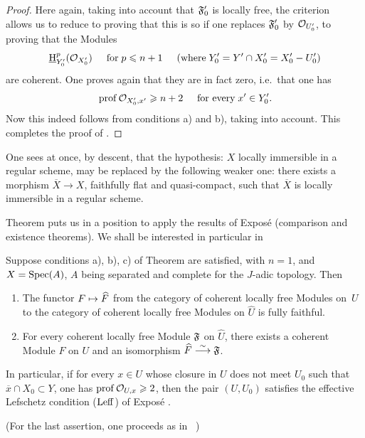 \begin{proof}
%
Here again, taking into account that $\mathfrak{F}_0'$ is locally free, the criterion ~ allows us to reduce to proving that this is so if one replaces $\mathfrak{F}_0'$ by ${\mathcal O}_{U'_0}$, \ie to proving that the Modules
\[
\operatorname{\underline{H}}^p_{Y_0'}({\mathcal O}_{X_0'}) \hspace{5mm} \text{for} \; p\leqslant n+1 \hspace{5mm} \text{(where} \; Y'_0=Y'\cap X_0'=X_0'- U'_0 \text{)}
\]
are coherent. One proves again that they are in fact zero, i.e.\ that one has
\steco
\begin{equation} \label{eq:XII.25} {}\operatorname{prof} {\mathcal O}_{X'_0, x'} \geqslant n+2 \hspace{5mm} \text{for every} \; x'\in Y'_0.
\end{equation}
Now this indeed follows from conditions a) and b), taking  into account. This completes the proof of .
\skipqed
\end{proof}

\begin{remark} \label{XII.4.3}
One sees at once, by descent, that the hypothesis: $X$ locally immersible in a regular scheme, may be replaced by the following weaker one: there exists a morphism $\overline{X}\to X$, faithfully flat and quasi-compact, such that $\overline{X}$ is locally immersible in a regular scheme.
\end{remark}

Theorem  puts us in a position to apply the results of Expos\'e  (comparison and existence theorems). We shall be interested in particular in

\begin{corollary} \label{XII.4.4}
Suppose conditions a), b), c) of Theorem  are satisfied, with $n=1$, and $X=\operatorname{Spec}(A)$, $A$ being separated and complete for the $J$-adic topology. Then
\begin{enumerate}
\item The functor $F\mto \widehat{F}$ from the category of coherent locally free Modules on~$U$ to the category of coherent locally free Modules on $\widehat{U}$ is fully faithful. \item For every coherent locally free Module $\mathfrak{F}$ on $\widehat{U}$, there exists a coherent Module $F$ on $U$ and an isomorphism $\widehat{F}\overset{\sim}{\longrightarrow} \mathfrak{F}$.
\end{enumerate}
In particular, if for every $x\in U$ whose closure in $U$ does not meet $U_0$ \ie such that $\overline{x}\cap X_0\subset Y$, one has $\operatorname{prof} {\mathcal O}_{U, x}\geqslant 2$, then the pair $(U, U_0)$ satisfies the effective Lefschetz condition ($\operatorname{Leff}$) of Expos\'e .
\end{corollary}
\noindent
(For the last assertion, one proceeds as in ~)

